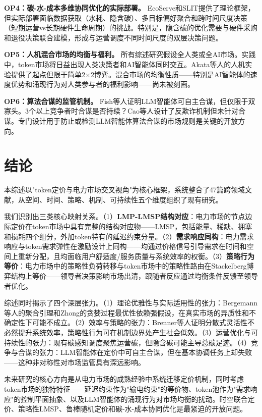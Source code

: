 \documentclass[11pt,twocolumn]{article}
\begin{document}
\textbf{OP4：碳-水-成本多维协同优化的实际部署。} EcoServe\cite{li2025ecoserve}和SLIT\cite{moore2025slit}提供了理论框架，但实际部署面临数据获取（水耗、隐含碳）、多目标偏好聚合和跨时间尺度决策（短期运营vs长期硬件生命周期）的挑战。特别是，隐含碳的优化需要与硬件采购和退役决策联合建模，形成与运营调度不同时间尺度的双层决策问题。

\textbf{OP5：人机混合市场的均衡与福利。} 所有综述研究假设全人类或全AI市场。实践中，token市场将日益出现人类决策者和AI智能体同时交互。Akata等人\cite{akata2025playing}的人机实验提供了起点但限于简单2$\times$2博弈。混合市场的均衡性质——特别是AI智能体的速度优势和涌现行为对人类参与者的福利影响——尚未被刻画。

\textbf{OP6：算法合谋的监管机制。} Fish等人\cite{fish2024algorithmic}证明LLM智能体可自主合谋，但仅限于双寡头。3个以上竞争者时合谋是否持续？Cao等人\cite{cao2025pay}设计了反欺诈机制但未针对合谋。专门设计用于防止或检测LLM智能体算法合谋的市场规则是关键的开放方向。

\section{结论}

本综述以"token定价与电力市场交叉视角"为核心框架，系统整合了47篇跨领域文献，从空间、时间、策略、机制、可持续性五个维度组织了现有研究。

我们识别出三类核心映射关系。（1）\textbf{LMP-LMSP结构对应}：电力市场的节点边际定价在token市场中具有完整的结构对应物——LMSP\cite{liu2026locational}，包括能量、稀缺、拥塞和损耗四个组分，外加token特有的延迟约束分量。（2）\textbf{需求响应同构}：电力需求响应\cite{vazquez2019reinforcement}与token需求弹性在激励设计上同构——均通过价格信号引导需求在时间和空间上重新分配，且均面临用户舒适度/服务质量与系统效率的权衡。（3）\textbf{策略行为等价}：电力市场中的策略性负荷转移\cite{brenner2026spatial,brenner2025strategic}与token市场中的策略性路由\cite{guo2025prilm}在Stackelberg博弈结构上等价——领导者决策影响市场出清，跟随者反应通过均衡条件反馈至领导者优化。

综述同时揭示了四个深层张力。（1）理论优雅性与实际适用性的张力：Bergemann等人\cite{bergemann2026menu}的聚合引理和Zhong\cite{zhong2026token}的贪婪过程最优性依赖强假设，在真实市场的异质性和不确定性下可能不成立。（2）效率与策略的张力：Brenner等人\cite{brenner2026spatial}证明分散式灵活性不必然提升系统效率，策略性行为可在机制边界处产生社会低效。（3）运营优化与可持续性的张力：现有碳感知调度\cite{li2025ecoserve,moore2025slit}聚焦运营碳，但隐含碳可能主导总碳足迹。（4）竞争与合谋的张力：LLM智能体在定价中可自主合谋\cite{fish2024algorithmic}，但在基本协调任务上却失败\cite{akata2025playing}——这种非对称性对市场监管具有深远影响。

未来研究的核心方向是从电力市场的成熟经验中系统迁移定价机制，同时考虑token市场的独特特征——延迟约束作为"输电约束"的等价物、token池作为"需求响应"的控制平面抽象、以及LLM智能体的涌现行为对市场均衡的扰动。时空联合定价、策略性LMSP、鲁棒随机定价和碳-水-成本协同优化是最紧迫的开放问题。



\end{document}
